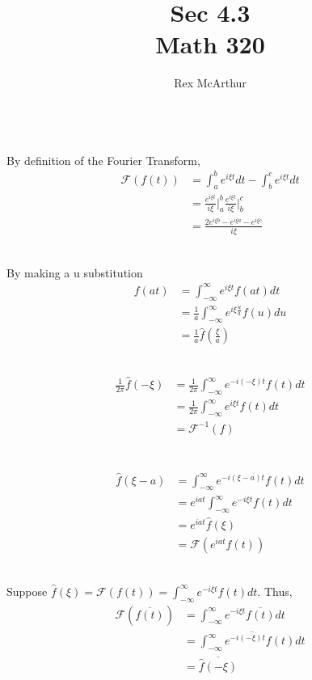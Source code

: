 \documentclass[letterpaper,12pt]{article}
\title{Sec 4.3 \\Math 320}
\author{Rex McArthur}
\theoremstyle{definition}
\begin{document}
\maketitle
{}\\
By definition of the Fourier Transform,
\begin{align*}
    \mathscr{F}(f(t)) & = \int^b_a e^{i \xi t} dt - \int _b ^c e^{i \xi t}dt \\
    & = \frac{e^{i \xi t}}{i \xi} \big| ^b _a  \frac{e^{i \xi t}}{i \xi}\big| ^c _b  \\
    & = \frac{2e^{i\xi b} - e^{i\xi a} - e^{i\xi c}}{i \xi}
\end{align*}

\\
By making a u substitution
\begin{align*}
    f(at) & = \int^\infty _{-\infty} e^{i \xi t} f(at) dt \\
    & = \frac{1}{a}\int^\infty _{-\infty} e^{i \xi \frac{u}{a}} f(u) du \\
    & = \frac{1}{a} \hat f(\frac{\xi}{a})
\end{align*}

\\
\begin{align*}
    \frac{1}{2\pi} \hat f(-\xi) & = \frac{1}{2 \pi} \int ^\infty_{-\infty} e^{-i(-\xi )t}f(t)dt \\
    & =  \frac{1}{2 \pi} \int ^\infty_{-\infty} e^{i\xi t}f(t)dt \\
    & = \mathscr{F}^{-1}(f)\\
\end{align*}

\\
\begin{align*}
    \hat f(\xi -a) & = \int ^\infty_{-\infty} e^{-i(\xi-a) t}f(t)dt \\
    & = e^{iat} \int ^\infty_{-\infty} e^{-i\xi t}f(t)dt \\
    & = e^{iat} \hat f(\xi) \\
    & = \mathscr{F}(e^{iat}f(t))
\end{align*}

\\
Suppose $\hat f(\xi) = \mathscr{F}(f(t)) = \int^\infty_{-\infty} e^{-i\xi t} f(t)dt$.
Thus,
\begin{align*}
    \mathscr{F}(\overline{f(t)})&  = \int^\infty_{-\infty} e^{-i\xi t} \overline{f(t)}dt \\
    & = \overline{\int^\infty_{-\infty} e^{-i(-\xi) t} f(t)dt} \\
    & = \overline{\hat f(-\xi)}
\end{align*}
\end{document}

